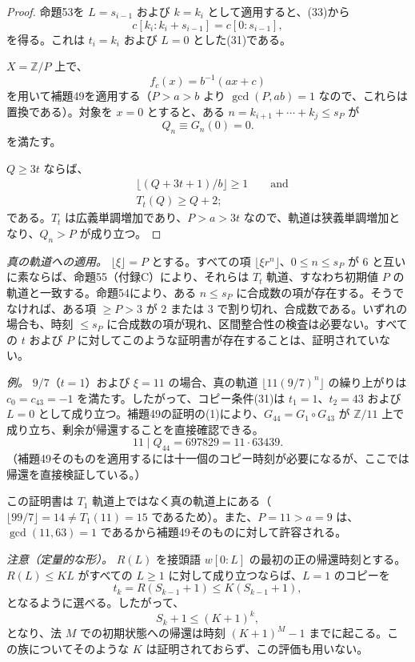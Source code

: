 \documentclass[11pt,reqno]{amsart}
\theoremstyle{definition}
\theoremstyle{definition}
\theoremstyle{remark}
\begin{document}
\begin{proof}\leavevmode\label{proof:54}
命題53を \(L=s_{i-1}\) および \(k=k_i\) として適用すると、(33)から
\[
c[k_i:k_i+s_{i-1}]=c[0:s_{i-1}],
\]
を得る。これは \(t_i=k_i\) および \(L=0\) とした(31)である。

\(X=\mathbb Z/P\) 上で、
\[
f_c(x)=b^{-1}(ax+c)
\]
を用いて補題49を適用する（\(P>a>b\) より \(\gcd(P,ab)=1\) なので、これらは置換である）。対象を \(x=0\) とすると、ある
\(n=k_{i+1}+\cdots+k_j\le s_P\)
が
\[
Q_n\equiv G_n(0)=0.
\]
を満たす。

\(Q\ge3t\) ならば、
\[
\begin{aligned}
&\lfloor(Q+3t+1)/b\rfloor\ge1\qquad\text{and}\\
&T_t(Q)\ge Q+2;
\end{aligned}
\]
である。\(T_t\) は広義単調増加であり、\(P>a>3t\) なので、軌道は狭義単調増加となり、\(Q_n>P\) が成り立つ。\qedhere
\end{proof}

\emph{真の軌道への適用。} \(\lfloor\xi\rfloor=P\) とする。すべての項
\(\lfloor\xi r^n\rfloor\)、\(0\le n\le s_P\) が \(6\) と互いに素ならば、命題55（付録C）により、それらは \(T_t\) 軌道、すなわち初期値 \(P\) の軌道と一致する。命題54により、ある \(n\le s_P\) に合成数の項が存在する。そうでなければ、ある項 \(\ge P>3\) が \(2\) または \(3\) で割り切れ、合成数である。いずれの場合も、時刻 \(\le s_P\) に合成数の項が現れ、区間整合性の検査は必要ない。すべての \(t\) および \(P\) に対してこのような証明書が存在することは、証明されていない。

\emph{例。} \(9/7\)（\(t=1\)）および \(\xi=11\) の場合、真の軌道 \(\lfloor11(9/7)^n\rfloor\) の繰り上がりは \(c_0=c_{43}=-1\) を満たす。したがって、コピー条件(31)は \(t_1=1\)、\(t_2=43\) および \(L=0\) として成り立つ。補題49の証明の(1)により、\(G_{44}=G_1\circ G_{43}\) が \(\mathbb Z/11\) 上で成り立ち、剰余が帰還することを直接確認できる。
\[
11\mid Q_{44}=697829=11\cdot63439.
\]
（補題49そのものを適用するには十一個のコピー時刻が必要になるが、ここでは帰還を直接検証している。）

この証明書は \(T_1\) 軌道上ではなく真の軌道上にある（\(\lfloor99/7\rfloor=14\ne T_1(11)=15\) であるため）。また、\(P=11>a=9\) は、\(\gcd(11,63)=1\) であるから補題49そのものに対して許容される。

\emph{注意（定量的な形）。} \(R(L)\) を接頭語 \(w[0:L]\) の最初の正の帰還時刻とする。\(R(L)\le KL\) がすべての \(L\ge1\) に対して成り立つならば、\(L=1\) のコピーを
\[
t_k=R(S_{k-1}+1)\le
K(S_{k-1}+1),
\]
となるように選べる。したがって、
\[
S_k+1\le(K+1)^k,
\]
となり、法 \(M\) での初期状態への帰還は時刻 \((K+1)^M-1\) までに起こる。この族についてそのような \(K\) は証明されておらず、この評価も用いない。
\end{document}
